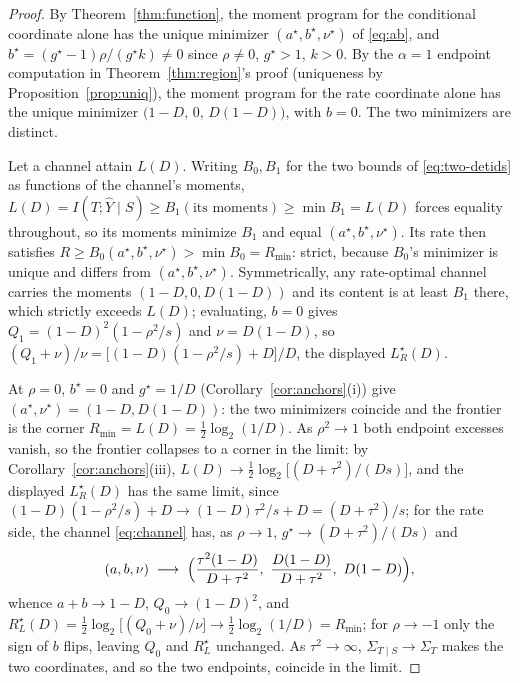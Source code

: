 ﻿\documentclass[11pt,onecolumn]{IEEEtran}
\newcommand{\hY}{\widehat{Y}}
\newcommand{\LRs}{L_{R}^{\star}}
\newcommand{\RLs}{R_{L}^{\star}}
\begin{document}
\begin{proof}
By Theorem~\ref{thm:function}, the moment program for the conditional
coordinate alone has the unique minimizer
$(a^\star,b^\star,\nu^\star)$ of \eqref{eq:ab}, and
$b^\star=(g^\star-1)\rho/(g^\star k)\ne0$ since $\rho\ne0$,
$g^\star>1$, $k>0$. By the $\alpha=1$ endpoint computation in
Theorem~\ref{thm:region}'s proof (uniqueness by
Proposition~\ref{prop:uniq}), the moment program for the rate
coordinate alone has the unique minimizer
$\bigl(1-D,\,0,\,D(1-D)\bigr)$, with $b=0$. The two minimizers are
distinct.

Let a channel attain $L(D)$. Writing $B_0,B_1$ for the two bounds of
\eqref{eq:two-detids} as functions of the channel's moments,
$L(D)=I(T;\hY\mid S)\ge B_1(\text{its moments})\ge\min B_1=L(D)$
forces equality throughout, so its moments minimize $B_1$ and equal
$(a^\star,b^\star,\nu^\star)$. Its rate then satisfies
$R\ge B_0(a^\star,b^\star,\nu^\star)>\min B_0=R_{\min}$: strict, because
$B_0$'s minimizer is unique and differs from
$(a^\star,b^\star,\nu^\star)$. Symmetrically, any rate-optimal channel
carries the moments $(1-D,0,D(1-D))$ and its content is at least $B_1$
there, which strictly exceeds $L(D)$; evaluating, $b=0$ gives
$Q_1=(1-D)^2(1-\rho^2/s)$ and $\nu=D(1-D)$, so
$(Q_1+\nu)/\nu=\bigl[(1-D)(1-\rho^2/s)+D\bigr]/D$, the displayed $\LRs(D)$.

At $\rho=0$, $b^\star=0$ and $g^\star=1/D$
(Corollary~\ref{cor:anchors}(i)) give
$(a^\star,\nu^\star)=(1-D,D(1-D))$: the two minimizers coincide and the
frontier is the corner $R_{\min}=L(D)=\tfrac12\log_2(1/D)$. As
$\rho^2\to1$ both endpoint excesses vanish, so the frontier collapses
to a corner in the limit: by Corollary~\ref{cor:anchors}(iii),
$L(D)\to\tfrac12\log_2\bigl[(D+\tau^2)/(Ds)\bigr]$, and the displayed
$\LRs(D)$ has the same limit, since
$(1-D)(1-\rho^2/s)+D\to(1-D)\tau^2/s+D=(D+\tau^2)/s$; for the rate
side, the channel \eqref{eq:channel} has, as $\rho\to1$,
$g^\star\to(D+\tau^2)/(Ds)$ and
\[
(a,b,\nu)\;\longrightarrow\;
\Bigl(\frac{\tau^2(1-D)}{D+\tau^2},\
\frac{D(1-D)}{D+\tau^2},\ D(1-D)\Bigr),
\]
whence $a+b\to1-D$, $Q_0\to(1-D)^2$, and
$\RLs(D)=\tfrac12\log_2\bigl[(Q_0+\nu)/\nu\bigr]
\to\tfrac12\log_2(1/D)=R_{\min}$; for $\rho\to-1$ only the sign of $b$
flips, leaving $Q_0$ and $\RLs$ unchanged. As $\tau^2\to\infty$,
$\Sigma_{T\mid S}\to\Sigma_T$ makes the two coordinates, and so the
two endpoints, coincide in the limit.
\end{proof}
\end{document}

